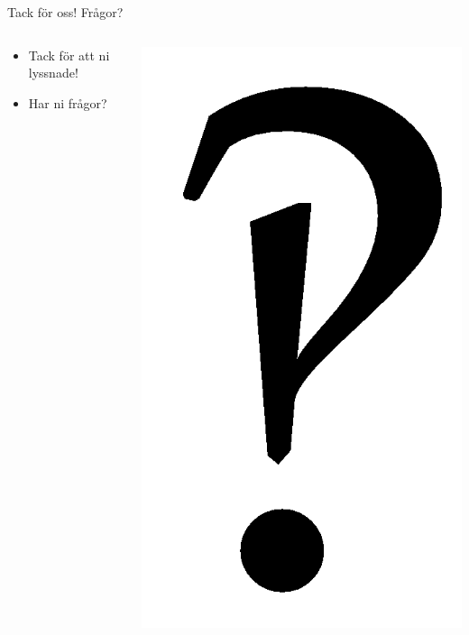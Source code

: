 \begin{frame}{Tack för oss! Frågor?}

\begin{columns}
    \begin{column}{0.4\textwidth}
        \begin{itemize}
			\item Tack för att ni lyssnade!
			\item Har ni frågor?
		\end{itemize}
    \end{column}
	\begin{column}{0.6\textwidth}
    	\includegraphics[height=0.7\textheight]{images/interrobang.png}
	\end{column}
\end{columns}

\end{frame}
